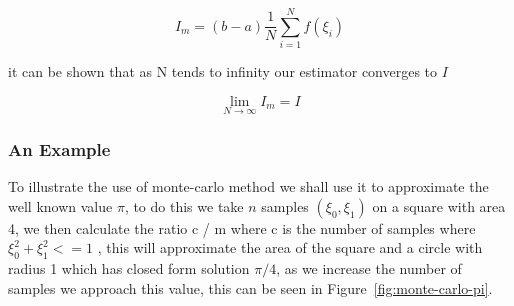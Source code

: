 \begin{equation}
I_m = (b - a) \frac{1}{N} \sum_{i=1}^N f(\xi_i)
\end{equation}

it can be shown that as N tends to infinity our estimator converges to $I$

\[ \lim_{N \to \infty} I_m = I \]

\subsubsection{An Example}
To illustrate the use of monte-carlo method we shall use it to approximate the well known value $\pi$, to do this we
take $n$ samples $(\xi_0, \xi_1)$ on a square with area 4, we then calculate the ratio c / m where c is the number of samples
where $\xi_0^2 + \xi_1^2 <= 1$ , this will approximate the area of the square and a circle with radius 1 which has closed form
solution $\pi / 4$, as we increase the number of samples we approach this value, this can be seen in Figure~\ref{fig:monte-carlo-pi}.

